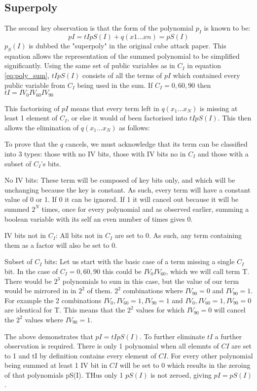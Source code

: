 \documentclass{report}
\let\Oldsubsection\subsection
\renewcommand{\subsection}{\FloatBarrier\Oldsubsection}
\begin{document}
\subsection{Superpoly}
The second key observation is that the form of the polynomial $p_I$ is known to be:
\begin{equation} \label{eq:GFpowers}
pI = tIpS(I)+q(x1...xn)=pS(I)
\end{equation}
$p_S(I)$ is dubbed the "superpoly" in the original cube attack paper. This equation allows the representation of the summed polynomial to be simplified significantly. Using the same set of public variables as in $C_I$ in equation 
\ref{eq:poly_sum}, $tIpS(I)$ consists of all the terms of $pI$ which contained  every public variable from $C_I$ being used in the sum. If $C_I={0, 60, 90}$ then  $tI = IV_{0}IV_{60}IV_{90}$

This factorising of $pI$ means that every term left in $q(x_1...x_N)$ is missing at least 1 element of $C_I$, or else it would of been factorised into $tIpS(I)$. This then allows the elimination of $q(x_1...x_N)$ as follows:

To prove that the $q$ cancels, we must acknowledge that its term can be classified into 3 types: those with no IV bits, those with IV bits no in $C_I$ and those with a subset of $C_I$'s bits.

No IV bits:
These term will be composed of key bits only, and which will be unchanging because the key is constant. As such, every term will have a constant value of 0 or 1. If 0 it can be ignored. If 1 it will cancel out because it will be summed $2^N$ times, once for every polynomial and as observed earlier, summing a boolean variable with its self an even number of times gives 0.

IV bits not in $C_I$:
All bits not in $C_I$ are set to 0. As such, any term containing them as a factor will also be set to 0.

Subset of $C_I$ bits:
Let us start with the basic case of a term missing a single $C_I$ bit. In the case of $C_I={0, 60, 90}$ this could be $IV_0IV_{60}$, which we will call term T. There would be $2^3$ polynomials to sum in this case, but the value of our term would be mirrored in in $2^2$ of them. $2^2$ combinations where $IV_{90}=0$ and $IV_{90}=1$. For example the 2 combinations $IV_0, IV_{60}=1, IV_{90}=1$ and $IV_0, IV_{60}=1, IV_{90}=0$ are identical for T. This means that the $2^2$ values for which $IV_{90}=0$ will cancel the $2^2$ values where $IV_{90}=1$.

The above demonstrates that $pI=tIpS(I)$. To further eliminate $tI$ a further observation is required. There is only 1 polynomial when all elemnts of $CI$ are set to 1 and tI by definition contains every element of $CI$. For every other polynomial being summed at least 1 IV bit in $CI$ will be set to 0 which results in the zeroing of that polynomials pS(I). THus only 1 $pS(I)$ is not zeroed, giving $pI=pS(I)$.
\end{document}
